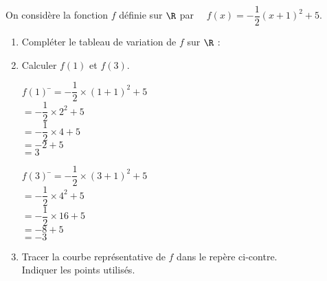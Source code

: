 \documentclass[a4paper,11pt,exos]{nsi}
\begin{document}
\maketitle


\exo{}
\textcolor{UGLiBlue}{On considère la fonction $f$ définie sur $\R$ par $\quad f(x)=-\dfrac{1}{2}(x+1)^2+5$.}

\begin{enumerate}%
	\item 	\textcolor{UGLiBlue}{Compléter le tableau de variation de $f$ sur $\R$ :}
	\begin{center}
	\end{center}
	\item 	\textcolor{UGLiBlue}{Calculer $f(1)$ et $f(3)$.}
	\begin{multicols}{2}
        \begin{tabbing}
            $f(1)$  \=$=-\dfrac{1}{2}\times (1+1)^2+5$\\[.5em]
                \>$=-\dfrac{1}{2}\times 2^2+5$\\[.5em]
                \>$=-\dfrac{1}{2}\times 4+5$\\
                \>$=-2+5$\\
                \>$=3$
        \end{tabbing}
        \begin{tabbing}
            $f(3)$  \=$=-\dfrac{1}{2}\times (3+1)^2+5$\\[.5em]
                \>$=-\dfrac{1}{2}\times 4^2+5$\\[.5em]
                \>$=-\dfrac{1}{2}\times 16+5$\\
                \>$=-8+5$\\
                \>$=-3$
        \end{tabbing}
    \end{multicols}
	\item 	
	\begin{minipage}{8cm}
		\textcolor{UGLiBlue}{Tracer la courbe représentative de $f$ dans le repère ci-contre.\\
		Indiquer les points utilisés.}
	\end{minipage}

\end{enumerate}
\end{document}
